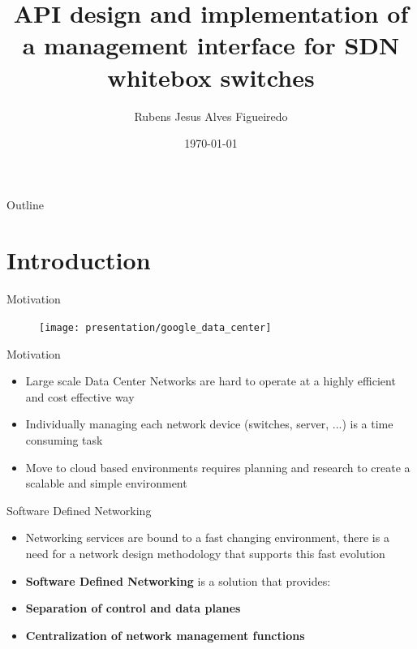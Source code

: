 \documentclass{beamer}
\title[Management Interface]{API design and implementation of a management interface for SDN whitebox switches }
\author{Rubens Jesus Alves Figueiredo}
\institute{FEUP}
\date{\today}
\begin{document}
\begin{frame}
  \titlepage
        \texttt{[image: \{uporto-feup]}}
        \texttt{[image: \{bisdn-logo]}}
\end{frame}

\begin{frame}{Outline}
  \tableofcontents
\end{frame}

\section{Introduction}

\begin{frame}{Motivation}
    \begin{figure}
        \centering
        \texttt{[image: presentation/google\_data\_center]}
    \end{figure}
\end{frame}

\begin{frame}{Motivation}
	\begin{itemize}
  		\item Large scale Data Center Networks are hard to operate at a highly efficient and cost effective way
        \item Individually managing each network device (switches, server, ...) is a time consuming task
  		\item Move to cloud based environments requires planning and research to create a scalable and simple environment
	\end{itemize}
\end{frame}

\begin{frame}{Software Defined Networking}
    \begin{itemize}
    \item Networking services are bound to a fast changing environment, there is a need for a network design methodology that supports this
        fast evolution
        \pause
    \item \textbf{Software Defined Networking} is a solution that provides:
        \pause
    \item \textbf{Separation of control and data planes} 
        \pause
    \item \textbf{Centralization of network management functions}
    \end{itemize}
\end{frame}
\end{document}
